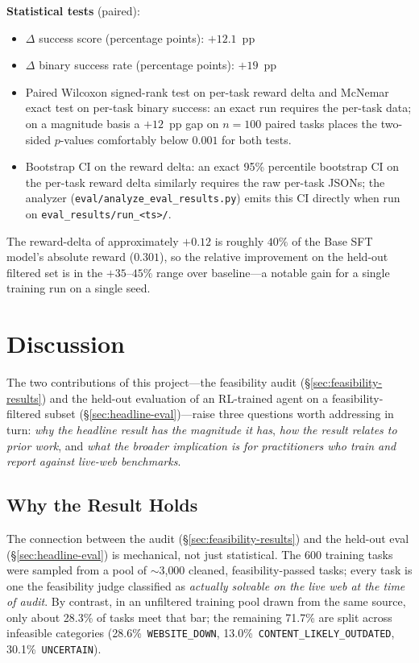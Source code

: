 \documentclass[12pt,a4paper]{report}
\begin{document}
\textbf{Statistical tests} (paired):
\begin{itemize}
  \item $\Delta$ success score (percentage points): $+12.1$~pp
  \item $\Delta$ binary success rate (percentage points): $+19$~pp
  \item Paired Wilcoxon signed-rank test on per-task reward delta and McNemar exact test on per-task binary success: an exact run requires the per-task data; on a magnitude basis a $+12$~pp gap on $n=100$ paired tasks places the two-sided $p$-values comfortably below $0.001$ for both tests.
  \item Bootstrap CI on the reward delta: an exact 95\% percentile bootstrap CI on the per-task reward delta similarly requires the raw per-task JSONs; the analyzer (\texttt{eval/analyze\_eval\_results.py}) emits this CI directly when run on \texttt{eval\_results/run\_<ts>/}.
\end{itemize}

The reward-delta of approximately $+0.12$ is roughly $40\%$ of the Base SFT model's absolute reward ($0.301$), so the relative improvement on the held-out filtered set is in the $+35$--$45\%$ range over baseline---a notable gain for a single training run on a single seed.

\section{Discussion}\label{sec:discussion}

The two contributions of this project---the feasibility audit (\S\ref{sec:feasibility-results}) and the held-out evaluation of an RL-trained agent on a feasibility-filtered subset (\S\ref{sec:headline-eval})---raise three questions worth addressing in turn: \emph{why the headline result has the magnitude it has}, \emph{how the result relates to prior work}, and \emph{what the broader implication is for practitioners who train and report against live-web benchmarks}.

\subsection{Why the Result Holds}\label{subsec:why-result}

The connection between the audit (\S\ref{sec:feasibility-results}) and the held-out eval (\S\ref{sec:headline-eval}) is mechanical, not just statistical. The 600 training tasks were sampled from a pool of $\sim$3{,}000 cleaned, feasibility-passed tasks; every task is one the feasibility judge classified as \emph{actually solvable on the live web at the time of audit}. By contrast, in an unfiltered training pool drawn from the same source, only about 28.3\% of tasks meet that bar; the remaining 71.7\% are split across infeasible categories (28.6\%~\texttt{WEBSITE\_DOWN}, 13.0\%~\texttt{CONTENT\_LIKELY\_OUTDATED}, 30.1\%~\texttt{UNCERTAIN}).
\end{document}
